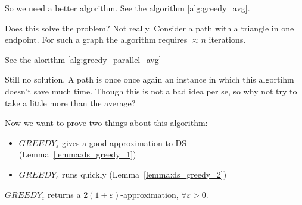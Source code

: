     So we need a better algorithm. See the algorithm \ref{alg:greedy_avg}.

    

    Does this solve the problem? Not really.
    Consider a path with a triangle in one endpoint. For such a graph the algorithm requires $\approx n$ iterations.

    See the alorithm \ref{alg:greedy_parallel_avg}

    

    Still no solution. A path is once once again an instance in which this algortihm doesn't save much time.
    Though this is not a bad idea per se, so why not try to take a little more than the average?

    

    Now we want to prove two things about this algorithm:
    \begin{itemize}
        \item $GREEDY_\varepsilon$ gives a good approximation to DS (Lemma~\ref{lemma:ds_greedy_1})
        \item $GREEDY_\varepsilon$ runs quickly (Lemma~\ref{lemma:ds_greedy_2})
    \end{itemize}

    \begin{lemma}\label{lemma:ds_greedy_1}
        $GREEDY_\varepsilon$ returns a $2(1+\varepsilon)$-approximation, $\forall \varepsilon > 0$.
    \end{lemma}

